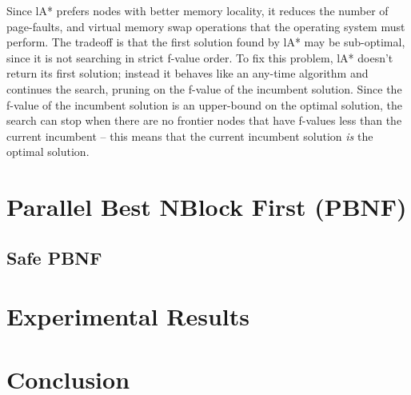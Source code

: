 \documentclass{article} \usepackage{aaai} \usepackage{graphicx}
\begin{document}
Since lA* prefers nodes with better memory locality, it reduces the
number of page-faults, and virtual memory swap operations that the
operating system must perform.  The tradeoff is that the first
solution found by lA* may be sub-optimal, since it is not searching in
strict f-value order.  To fix this problem, lA* doesn't return its
first solution; instead it behaves like an any-time algorithm and
continues the search, pruning on the f-value of the incumbent
solution.  Since the f-value of the incumbent solution is an
upper-bound on the optimal solution, the search can stop when there
are no frontier nodes that have f-values less than the current
incumbent -- this means that the current incumbent solution \emph{is}
the optimal solution.


\section{Parallel Best NBlock First (PBNF)}
\subsection{Safe PBNF}
\section{Experimental Results}
\section{Conclusion}



\end{document}
